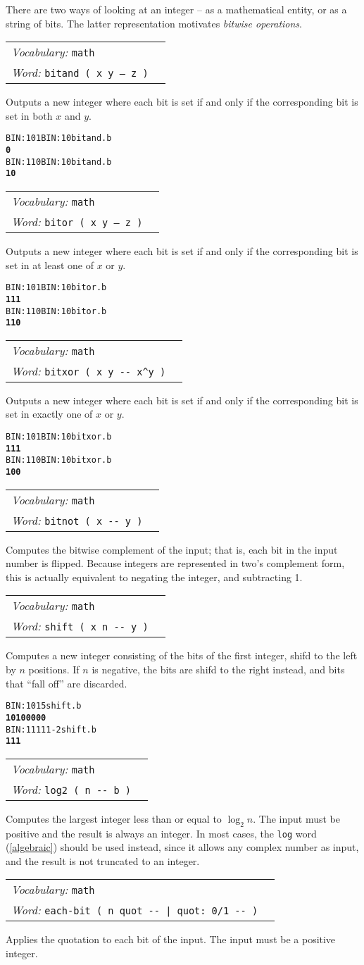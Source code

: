 \documentclass{book}
\newcommand{\vocabulary}[1]{\emph{Vocabulary:} \texttt{#1}&\\}
\newcommand{\ordinaryword}[2]{\index{\texttt{#1}}\emph{Word:} \texttt{#2}&\\}
\newcommand{\wordtable}[1]{


\begin{tabularx}{12cm}{lX}
\hline
#1
\hline
\end{tabularx}

}
\begin{document}
There are two ways of looking at an integer -- as a mathematical entity, or as a string of bits. The latter representation motivates \emph{bitwise operations}.
\wordtable{
\vocabulary{math}
\ordinaryword{bitand}{bitand ( x y -- z )}
}
Outputs a new integer where each bit is set if and only if the corresponding bit is set in both $x$ and $y$.
\begin{alltt}
  BIN: 101 BIN: 10 bitand .b
\textbf{0}
  BIN: 110 BIN: 10 bitand .b
\textbf{10}
\end{alltt}
\wordtable{
\vocabulary{math}
\ordinaryword{bitor}{bitor ( x y -- z )}
}
Outputs a new integer where each bit is set if and only if the corresponding bit is set in at least one of $x$ or $y$.
\begin{alltt}
  BIN: 101 BIN: 10 bitor .b
\textbf{111}
  BIN: 110 BIN: 10 bitor .b
\textbf{110}
\end{alltt}
\wordtable{
\vocabulary{math}
\ordinaryword{bitxor}{bitxor ( x y -{}- x\^{}y )}
}
Outputs a new integer where each bit is set if and only if the corresponding bit is set in exactly one of $x$ or $y$.
\begin{alltt}
  BIN: 101 BIN: 10 bitxor .b
\textbf{111}
  BIN: 110 BIN: 10 bitxor .b
\textbf{100}
\end{alltt}
\wordtable{
\vocabulary{math}
\ordinaryword{bitnot}{bitnot ( x -{}- y )}
}
Computes the bitwise complement of the input; that is, each bit in the input number is flipped. Because integers are represented in two's complement form, this is actually equivalent to negating the integer, and subtracting 1.
\wordtable{
\vocabulary{math}
\ordinaryword{shift}{shift ( x n -{}- y )}
}
Computes a new integer consisting of the bits of the first integer, shifd to the left by $n$ positions. If $n$ is negative, the bits are shifd to the right instead, and bits that ``fall off'' are discarded.
\begin{alltt}
  BIN: 101 5 shift .b
\textbf{10100000}
  BIN: 11111 -2 shift .b
\textbf{111}
\end{alltt}

\wordtable{
\vocabulary{math}
\ordinaryword{log2}{log2 ( n -{}- b )}
}
Computes the largest integer less than or equal to $\log_2 n$. The input must be positive and the result is always an integer. In most cases, the \verb|log| word (\ref{algebraic}) should be used instead, since it allows any complex number as input, and the result is not truncated to an integer.

\wordtable{
\vocabulary{math}
\ordinaryword{each-bit}{each-bit ( n quot -{}- | quot: 0/1 -{}- )}
}
Applies the quotation to each bit of the input. The input must be a positive integer.
\end{document}
